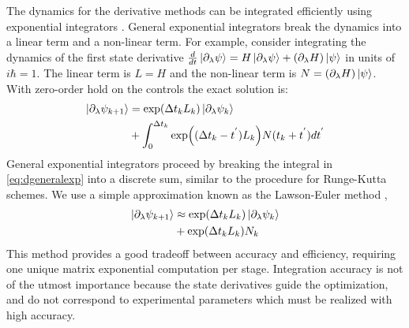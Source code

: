 The dynamics for the derivative methods can be integrated efficiently using exponential integrators
\cite{auer2018magnus, berland2005solving, einkemmer2017performance}.
General exponential integrators break the dynamics into a linear term and a non-linear term.
For example, consider
integrating the dynamics of the first state derivative $\frac{d}{dt} \ket{\partial_{\lambda} \psi} =
H \ket{\partial_{\lambda} \psi} + (\partial_{\lambda} H) \ket{\psi}$ in units of $i\hbar = 1$.
The linear term is $L = H$ and the non-linear term is $N = (\partial_{\lambda} H) \ket{\psi}$.
With zero-order hold on the controls the exact solution is:
\begin{equation}
  \label{eq:dgeneralexp}
  \begin{aligned}
    \ket{\partial_{\lambda} \psi_{k + 1}} &= \exp(\Delta t_{k} L_{k})
    \ket{\partial_{\lambda} \psi_{k}}\\
    &+ \int_{0}^{\Delta t_{k}} \exp((\Delta t_{k} - t^{'})L_{k})
    N(t_{k} + t^{'}) dt^{'}\\
  \end{aligned}
\end{equation}
General exponential integrators proceed by breaking the integral in \eqref{eq:dgeneralexp}
into a discrete sum, similar to the procedure
for Runge-Kutta schemes. We use a simple approximation known as the Lawson-Euler
method \cite{berland2005solving},
\begin{equation}
  \begin{aligned}
    \ket{\partial_{\lambda} \psi_{k + 1}} &\approx \exp(\Delta t_{k}L_{k}) \ket{\partial_{\lambda} \psi_{k}}\\
    &+ \exp(\Delta t_{k}L_{k}) N_{k}\\
  \end{aligned}
\end{equation}
This method provides a good tradeoff between accuracy and efficiency, requiring one unique matrix
exponential computation per stage. Integration accuracy is not of the utmost importance because the
state derivatives guide the optimization, and do not correspond to experimental parameters
which must be realized with high accuracy.




